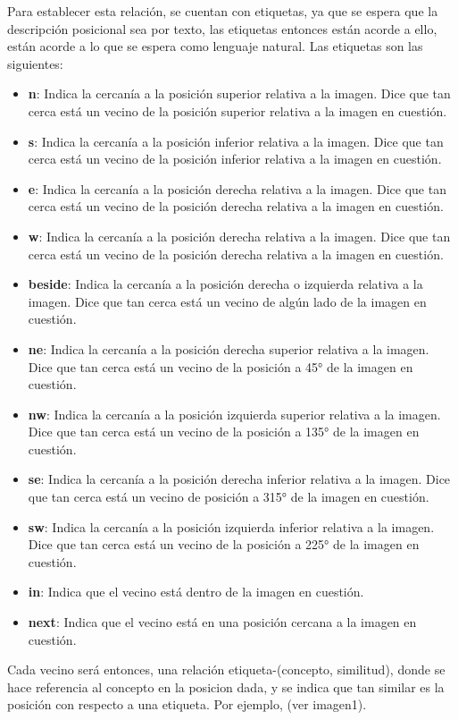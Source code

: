 Para establecer esta relación, se cuentan con etiquetas, ya que se espera que la descripción posicional sea por texto, las etiquetas entonces están acorde a ello, están acorde a lo que se espera como lenguaje natural. Las etiquetas son las siguientes:
\begin{itemize}
    \item \textbf{n}: Indica la cercanía a la posición superior relativa a la imagen. Dice que tan cerca está un vecino de la posición superior relativa a la imagen en cuestión.
    \item \textbf{s}: Indica la cercanía a la posición inferior relativa a la imagen. Dice que tan cerca está un vecino de la posición inferior relativa a la imagen en cuestión.
    \item \textbf{e}: Indica la cercanía a la posición derecha relativa a la imagen. Dice que tan cerca está un vecino de la posición derecha relativa a la imagen en cuestión.
    \item \textbf{w}: Indica la cercanía a la posición derecha relativa a la imagen. Dice que tan cerca está un vecino de la posición derecha relativa a la imagen en cuestión.
    \item \textbf{beside}: Indica la cercanía a la posición derecha o izquierda relativa a la imagen. Dice que tan cerca está un vecino de alg\'un lado de la imagen en cuestión.
    \item \textbf{ne}: Indica la cercanía a la posición derecha superior relativa a la imagen. Dice que tan cerca está un vecino de la posición a 45° de la imagen en cuestión.
    \item \textbf{nw}: Indica la cercanía a la posición izquierda superior relativa a la imagen. Dice que tan cerca está un vecino de la posición a 135° de la imagen en cuestión.
    \item \textbf{se}: Indica la cercanía a la posición derecha inferior relativa a la imagen. Dice que tan cerca está un vecino de posición a 315° de la imagen en cuestión.
    \item \textbf{sw}: Indica la cercanía a la posición izquierda inferior relativa a la imagen. Dice que tan cerca está un vecino de la posición a 225° de la imagen en cuestión.
    \item \textbf{in}: Indica que el vecino está dentro de la imagen en cuestión.
    \item \textbf{next}: Indica que el vecino está en una posición cercana a la imagen en cuestión.
\end{itemize}
Cada vecino será entonces, una relación etiqueta-(concepto, similitud), donde se hace referencia al concepto en la posicion dada, y se indica que tan similar es la posición con respecto a una etiqueta. Por ejemplo, (ver imagen1).

